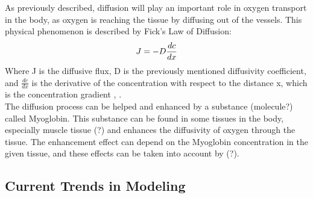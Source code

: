 As previously described, diffusion will play an important role in oxygen transport in the body, as oxygen is reaching the tissue by diffusing out of the vessels. This physical phenomenon is described by Fick's Law of Diffusion:
\begin{equation}
\\J = - D \frac{dc}{dx}
\label{Fick}
\end{equation}
Where J is the diffusive flux, D is the previously mentioned diffusivity coefficient, and $\frac{dc}{dx}$ is the derivative of the concentration with respect to the distance x, which is the concentration gradient \cite{pittman2011regulation}, \cite{lee2017accounting}.
\\The diffusion process can be helped and enhanced by a substance (molecule?) called Myoglobin. This substance can be found in some tissues in the body, especially muscle tissue (?) and enhances the diffusivity of oxygen through the tissue. The enhancement effect can depend on the Myoglobin concentration in the given tissue, and these effects can be taken into account by (?). \cite{wittenberg1970myoglobin}


\subsection{Current Trends in Modeling}

